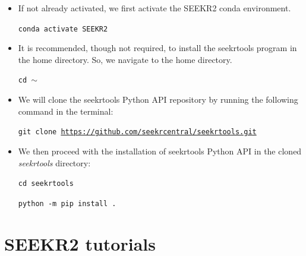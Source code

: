 \documentclass[9pt,training,pubversion]{livecoms}
\newcommand{\seekrtoolsgithublink}{\url{https://github.com/seekrcentral/seekrtools.git}}
\begin{document}
\begin{itemize}

\item If not already activated, we first activate the SEEKR2 conda environment. 

\begin{tcolorbox}[colback=black!8!white, colframe=black!50!black, fontlower=\tiny, left=2pt, right=2pt, top=2pt, bottom=2pt] 
\texttt{conda activate SEEKR2}
\end{tcolorbox}

\item It is recommended, though not required, to install the seekrtools program in the home directory. So, we navigate to the home directory. 

\begin{tcolorbox}[colback=black!8!white, colframe=black!50!black, fontlower=\tiny, left=2pt, right=2pt, top=2pt, bottom=2pt] 
\texttt{cd $\sim$}
\end{tcolorbox}

\item We will clone the seekrtools Python API repository by running the following command in the terminal:

\begin{tcolorbox}[colback=black!8!white, colframe=black!50!black, fontlower=\tiny, left=2pt, right=2pt, top=2pt, bottom=2pt] 
\texttt{git clone \seekrtoolsgithublink}
\end{tcolorbox}

\item We then proceed with the installation of seekrtools Python API in the cloned \textit{seekrtools} directory:

\begin{tcolorbox}[colback=black!8!white, colframe=black!50!black, fontlower=\tiny, left=2pt, right=2pt, top=2pt, bottom=2pt] 
\texttt{cd seekrtools} 
\end{tcolorbox}

\begin{tcolorbox}[colback=black!8!white, colframe=black!50!black, fontlower=\tiny, left=2pt, right=2pt, top=2pt, bottom=2pt] 
\texttt{python -m pip install .}
\end{tcolorbox}

\end{itemize}

\section{SEEKR2 tutorials}
\vspace{2mm}
\end{document}
